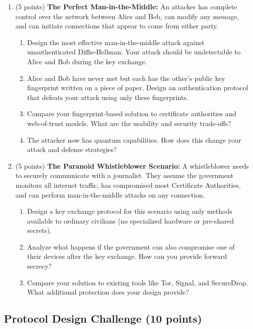 \documentclass[10pt,a4paper,american]{exam}
\begin{document}
\begin{enumerate}
	\item (5 points) \textbf{The Perfect Man-in-the-Middle:}
	      An attacker has complete control over the network between Alice and Bob, can modify any message, and can initiate connections that appear to come from either party.
	      \begin{enumerate}
		      \item Design the most effective man-in-the-middle attack against unauthenticated Diffie-Hellman. Your attack should be undetectable to Alice and Bob during the key exchange.
		      \item Alice and Bob have never met but each has the other's public key fingerprint written on a piece of paper. Design an authentication protocol that defeats your attack using only these fingerprints.
		      \item Compare your fingerprint-based solution to certificate authorities and web-of-trust models. What are the usability and security trade-offs?
		      \item The attacker now has quantum capabilities. How does this change your attack and defense strategies?
	      \end{enumerate}
	\item (5 points) \textbf{The Paranoid Whistleblower Scenario:}
	      A whistleblower needs to securely communicate with a journalist. They assume the government monitors all internet traffic, has compromised most Certificate Authorities, and can perform man-in-the-middle attacks on any connection.
	      \begin{enumerate}
		      \item Design a key exchange protocol for this scenario using only methods available to ordinary civilians (no specialized hardware or pre-shared secrets).
		      \item Analyze what happens if the government can also compromise one of their devices after the key exchange. How can you provide forward secrecy?
		      \item Compare your solution to existing tools like Tor, Signal, and SecureDrop. What additional protection does your design provide?
	      \end{enumerate}
\end{enumerate}

\subsection{Protocol Design Challenge (10 points)}
\end{document}
